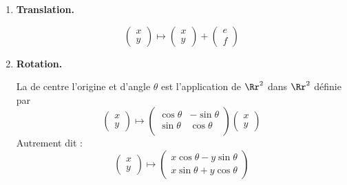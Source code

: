 \documentclass[11pt,class=report,crop=false]{standalone}
\begin{document}
\begin{exemple}
	\sauteligne
	\begin{enumerate}
		\item \textbf{Translation.}
		
		
		\begin{minipage}{0.55\textwidth}
			$$\begin{pmatrix}x \\ y \end{pmatrix} \mapsto \begin{pmatrix}x \\ y \end{pmatrix} + \begin{pmatrix} e \\ f \end{pmatrix}$$
		\end{minipage}
		\begin{minipage}{0.45\textwidth}
		\end{minipage}
		
		\item \textbf{Rotation.}
		
		\begin{minipage}{0.55\textwidth}
			La  de centre l'origine et d'angle $\theta$
			est l'application de $\Rr^2$ dans $\Rr^2$ définie par
			$$\begin{pmatrix}x \\ y \end{pmatrix} \mapsto \begin{pmatrix}\cos \theta & -\sin \theta \\ 
				\sin\theta & \cos \theta\\ \end{pmatrix}\begin{pmatrix}x \\ y \end{pmatrix}$$
			Autrement dit :
			$$\begin{pmatrix}x \\ y \end{pmatrix} \mapsto \begin{pmatrix} x \cos \theta - y \sin \theta \\ x\sin \theta + y \cos \theta\end{pmatrix}$$
		\end{minipage}
		\begin{minipage}{0.45\textwidth}
		\end{minipage}
		

\end{enumerate}
\end{exemple}
\end{document}

